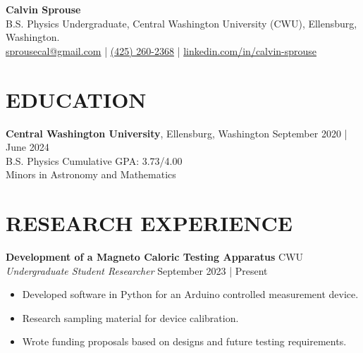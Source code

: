 \documentclass[a4paper,9pt]{extarticle}
\begin{document}
\pagestyle{fancy}
\renewcommand{\headrulewidth}{0pt}
\fancyhead{}
\thispagestyle{empty}

\begin{flushleft}
\textbf{\LARGE Calvin Sprouse}\\[2pt]
B.S. Physics Undergraduate, Central Washington University (CWU), Ellensburg, Washington.\\
\href{mailto:sprousecal@gmail.com}{sprousecal@gmail.com}
 | \href{tel:4252602368}{(425) 260-2368}
 | \href{https://www.linkedin.com/in/calvin-sprouse}{linkedin.com/in/calvin-sprouse}
\end{flushleft}




\section*{EDUCATION}
\noindent
\textbf{Central Washington University}, Ellensburg, Washington \hfill September 2020 | June 2024\\
B.S. Physics \hfill Cumulative GPA: 3.73/4.00 \\
Minors in Astronomy and Mathematics


\section*{RESEARCH EXPERIENCE}
\noindent\textbf{Development of a Magneto Caloric Testing Apparatus} \hfill CWU\\
\textit{Undergraduate Student Researcher} \hfill September 2023 | Present
\begin{itemize}
    \item Developed software in Python for an Arduino controlled measurement device.
    \item Research sampling material for device calibration.
    \item Wrote funding proposals based on designs and future testing requirements.
\end{itemize}
\end{document}
